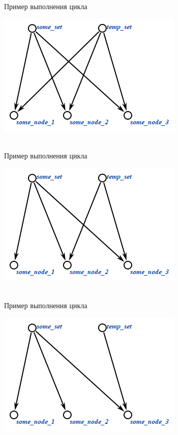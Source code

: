 \begin{frame}{\\Пример выполнения цикла}
	\topline
	\justifying
	\vspace{10mm}
	
	\begin{center}
		\includegraphics[scale=0.8]{figures/sd_scp/cycle1.png}
	\end{center}
	
\end{frame}

\begin{frame}{\\Пример выполнения цикла}
	\topline
	\justifying
	\vspace{10mm}
	
	\begin{center}
		\includegraphics[scale=0.8]{figures/sd_scp/cycle2.png}
	\end{center}
	
\end{frame}

\begin{frame}{\\Пример выполнения цикла}
	\topline
	\justifying
	\vspace{10mm}
	
	\begin{center}
		\includegraphics[scale=0.8]{figures/sd_scp/cycle3.png}
	\end{center}
	
\end{frame}

